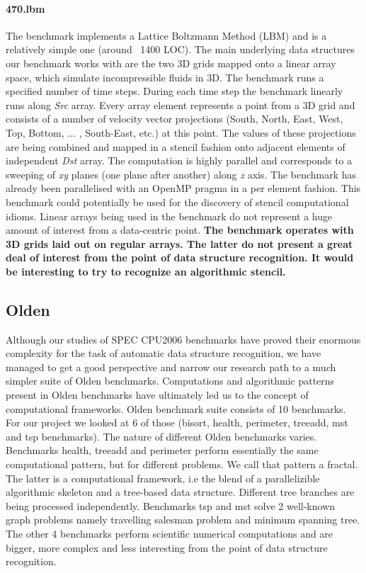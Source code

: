\paragraph{470.lbm} The benchmark implements a Lattice Boltzmann Method (LBM) and is a relatively simple one (around ~1400 LOC). The main underlying data structures our benchmark works with are the two 3D grids mapped onto a linear array space, which simulate incompressible fluids in 3D. The benchmark runs a specified number of time steps. During each time step the benchmark linearly runs along \textit{Src} array. Every array element represents a point from a 3D grid and consists of a number of velocity vector projections (South, North, East, West, Top, Bottom,  ... , South-East, etc.) at this point. The values of these projections are being combined and mapped in a stencil fashion onto adjacent elements of independent \textit{Dst} array. The computation is highly parallel and corresponds to a sweeping of \textit{xy} planes (one plane after another) along \textit{z} axis. The benchmark has already been parallelised with an OpenMP pragma in a per element fashion. This benchmark could potentially be used for the discovery of stencil computational idioms. Linear arrays being used in the benchmark do not represent a huge amount of interest from a data-centric point.\newline\null
\quad\textbf{The benchmark operates with 3D grids laid out on regular arrays. The latter do not present a great deal of interest from the point of data structure recognition. It would be interesting to try to recognize an algorithmic stencil.}

\subsection{Olden}
\label{background_benchmarks_olden}
\quad Although our studies of SPEC CPU2006 benchmarks have proved their enormous complexity for the task of automatic data structure recognition, we have managed to get a good perspective and narrow our research path to a much simpler suite of Olden benchmarks. Computations and algorithmic patterns present in Olden benchmarks have ultimately led us to the concept of computational frameworks.\newline\null
\quad Olden benchmark suite consists of 10 benchmarks. For our project we looked at 6 of those (bisort, health, perimeter, treeadd, mst and tsp benchmarks). The nature of different Olden benchmarks varies. Benchmarks health, treeadd and perimeter perform essentially the same computational pattern, but for different problems. We call that pattern a fractal. The latter is a computational framework, i.e the blend of a parallelizible algorithmic skeleton and a tree-based data structure. Different tree branches are being processed independently. Benchmarks tsp and mst solve 2 well-known graph problems namely travelling salesman problem and minimum spanning tree. The other 4 benchmarks perform scientific numerical computations and are bigger, more complex and less interesting from the point of data structure recognition.

